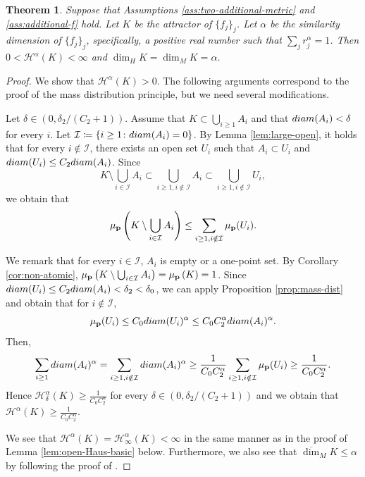 \documentclass[10pt,a4paper]{amsart}
\newtheorem{Thm}{Theorem}[section]
\begin{document}
\begin{Thm}\label{thm:main}
Suppose that  Assumptions \ref{ass:two-additional-metric} and \ref{ass:additional-f}  hold. 
Let $K$ be the attractor of $\{f_j\}_j$. 
Let $\alpha$ be the similarity dimension of $\{f_j\}_j$, specifically,  a positive real number such that $\sum_j r_j^{\alpha} = 1$. 
Then $0 < \mathcal{H}^{\alpha}(K) < \infty$ and $\dim_H K = \dim_M K = \alpha$. 
\end{Thm}

\begin{proof}
We show that $ \mathcal{H}^{\alpha}(K) > 0$. 
The following arguments correspond to the proof of the mass distribution principle, but we need several modifications. 

Let $\delta \in (0, \delta_2 /(C_2 + 1))$. 
Assume that $K \subset \bigcup_{i \ge 1} A_i$ and that $\textup{diam}(A_i) < \delta$ for every $i$. 
Let $\mathcal{I} \coloneqq \{i \ge 1 \colon \textup{diam}(A_i) = 0\}$.   
By Lemma \ref{lem:large-open}, 
it holds that for every $i \notin \mathcal{I}$, there exists an open set $U_i$ such that $A_i \subset U_i$ and $\textup{diam}(U_i) \le C_2 \textup{diam}(A_i)$. 
Since 
\[ K \setminus \bigcup_{i \in \mathcal{I}} A_i \subset  \bigcup_{i \ge 1, i \notin \mathcal{I}} A_i \subset  \bigcup_{i \ge 1, i \notin \mathcal{I}} U_i, \]
we obtain that 
\[ \mu_{\bf p}\left( K \setminus \bigcup_{i \in \mathcal{I}} A_i  \right) \le \sum_{i \ge 1, i \notin \mathcal{I}} \mu_{\bf p}(U_i). \]

We remark that for every $i \in \mathcal{I}$, $A_i$ is empty or a one-point set. 
By Corollary \ref{cor:non-atomic}, $ \mu_{\bf p}\left( K \setminus \bigcup_{i \in \mathcal{I}} A_i  \right)  =  \mu_{\bf p}\left( K \right)  = 1$. 
Since $ \textup{diam}(U_i) \le C_2 \textup{diam}(A_i) < \delta_2 < \delta_0$, 
we can apply Proposition \ref{prop:mass-dist} and obtain that for $i \notin \mathcal{I}$, 
\[ \mu_{\bf p}(U_i) \le C_0  \textup{diam}(U_i) ^{\alpha} \le C_0 C_2^{\alpha} \textup{diam}(A_i)^{\alpha}.\] 
Then, 
\[ \sum_{i \ge 1} \textup{diam}(A_i)^{\alpha} = \sum_{i \ge 1, i \notin \mathcal{I}} \textup{diam}(A_i)^{\alpha} \ge \frac{1}{C_0 C_2^{\alpha}} \sum_{i \ge 1, i \notin \mathcal{I}} \mu_{\bf p}(U_i) \ge  \frac{1}{C_0 C_2^{\alpha}}.  \]
Hence $\mathcal{H}^{\alpha}_{\delta}(K) \ge  \frac{1}{C_0 C_2^{\alpha}}$ for every $\delta \in (0,\delta_2 /(C_2 + 1))$ and we obtain that $\mathcal{H}^{\alpha}(K) \ge  \frac{1}{C_0 C_2^{\alpha}}$. 

We see that $\mathcal{H}^{\alpha}(K) = \mathcal{H}^{\alpha}_{\infty}(K)  < \infty$ in the same manner as in the proof of Lemma \ref{lem:open-Haus-basic} below. 
Furthermore, we also see that $\overline{\dim}_M K \le \alpha$ by following the proof of \cite[Theorem 2.2.2 (ii)]{BishopPeres2017}. 
\end{proof}
\end{document}

